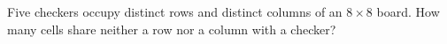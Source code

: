 Five checkers occupy distinct rows and distinct columns of an $8\times8$ board. How many cells share neither a row nor a column with a checker?
